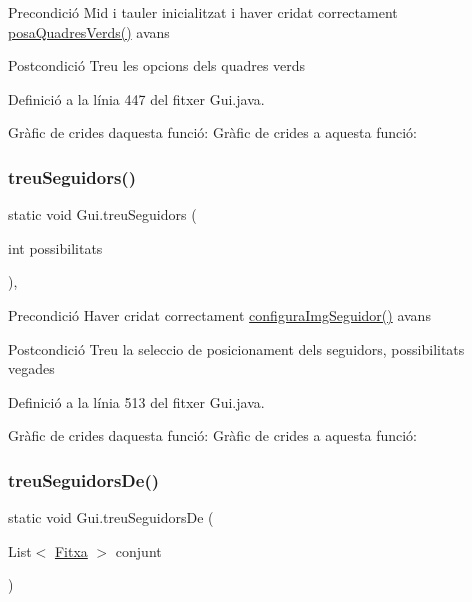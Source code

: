 \begin{DoxyPrecond}{Precondició}
Mid i tauler inicialitzat i haver cridat correctament \mbox{\hyperlink{class_gui_ad47e710172d53afbd0dfdd410a1c8126}{posa\+Quadres\+Verds()}} avans 
\end{DoxyPrecond}
\begin{DoxyPostcond}{Postcondició}
Treu les opcions dels quadres verds 
\end{DoxyPostcond}


Definició a la línia 447 del fitxer Gui.\+java.

Gràfic de crides d\textquotesingle{}aquesta funció\+:
Gràfic de crides a aquesta funció\+:
\mbox{\label{class_gui_a3887b907e40f86fddd2ff2f182342b7c}} 
\subsubsection{\texorpdfstring{treu\+Seguidors()}{treuSeguidors()}}
{\footnotesize\ttfamily static void Gui.\+treu\+Seguidors (\begin{DoxyParamCaption}\item[{int}]{possibilitats }\end{DoxyParamCaption})\hspace{0.3cm}{\ttfamily [static]}, {\ttfamily [private]}}

\begin{DoxyPrecond}{Precondició}
Haver cridat correctament \mbox{\hyperlink{class_gui_af2be44020696cbe2bce2ff4b90d94cc1}{configura\+Img\+Seguidor()}} avans 
\end{DoxyPrecond}
\begin{DoxyPostcond}{Postcondició}
Treu la seleccio de posicionament dels seguidors, possibilitats vegades 
\end{DoxyPostcond}


Definició a la línia 513 del fitxer Gui.\+java.

Gràfic de crides d\textquotesingle{}aquesta funció\+:
Gràfic de crides a aquesta funció\+:
\mbox{\label{class_gui_a8e60b9f1428fae6afd4e419d52bc0723}} 
\subsubsection{\texorpdfstring{treu\+Seguidors\+De()}{treuSeguidorsDe()}}
{\footnotesize\ttfamily static void Gui.\+treu\+Seguidors\+De (\begin{DoxyParamCaption}\item[{List$<$ \mbox{\hyperlink{class_fitxa}{Fitxa}} $>$}]{conjunt }\end{DoxyParamCaption})\hspace{0.3cm}{\ttfamily [static]}}

